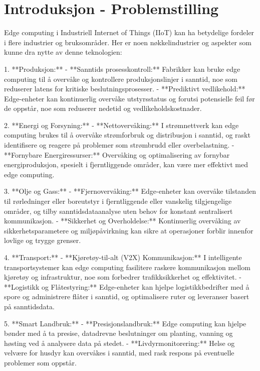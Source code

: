 
\section{Introduksjon - Problemstilling}


Edge computing i Industriell Internet of Things (IIoT) kan ha betydelige fordeler i flere industrier og bruksområder. Her er noen nøkkelindustrier og aspekter som kunne dra nytte av denne teknologien:

1. **Produksjon:**
   - **Sanntids prosesskontroll:** Fabrikker kan bruke edge computing til å overvåke og kontrollere produksjonslinjer i sanntid, noe som reduserer latens for kritiske beslutningsprosesser.
   - **Prediktivt vedlikehold:** Edge-enheter kan kontinuerlig overvåke utstyrsstatus og forutsi potensielle feil før de oppstår, noe som reduserer nedetid og vedlikeholdskostnader.

2. **Energi og Forsyning:**
   - **Nettovervåking:** I strømnettverk kan edge computing brukes til å overvåke strømforbruk og distribusjon i sanntid, og raskt identifisere og reagere på problemer som strømbrudd eller overbelastning.
   - **Fornybare Energiressurser:** Overvåking og optimalisering av fornybar energiproduksjon, spesielt i fjerntliggende områder, kan være mer effektivt med edge computing.

3. **Olje og Gass:**
   - **Fjernovervåking:** Edge-enheter kan overvåke tilstanden til rørledninger eller boreutstyr i fjerntliggende eller vanskelig tilgjengelige områder, og tilby sanntidsdataanalyse uten behov for konstant sentralisert kommunikasjon.
   - **Sikkerhet og Overholdelse:** Kontinuerlig overvåking av sikkerhetsparametere og miljøpåvirkning kan sikre at operasjoner forblir innenfor lovlige og trygge grenser.

4. **Transport:**
   - **Kjøretøy-til-alt (V2X) Kommunikasjon:** I intelligente transportsystemer kan edge computing fasilitere raskere kommunikasjon mellom kjøretøy og infrastruktur, noe som forbedrer trafikksikkerhet og effektivitet.
   - **Logistikk og Flåtestyring:** Edge-enheter kan hjelpe logistikkbedrifter med å spore og administrere flåter i sanntid, og optimalisere ruter og leveranser basert på sanntidsdata.

5. **Smart Landbruk:**
   - **Presisjonslandbruk:** Edge computing kan hjelpe bønder med å ta presise, datadrevne beslutninger om planting, vanning og høsting ved å analysere data på stedet.
   - **Livdyrmonitorering:** Helse og velvære for husdyr kan overvåkes i sanntid, med rask respons på eventuelle problemer som oppstår.


